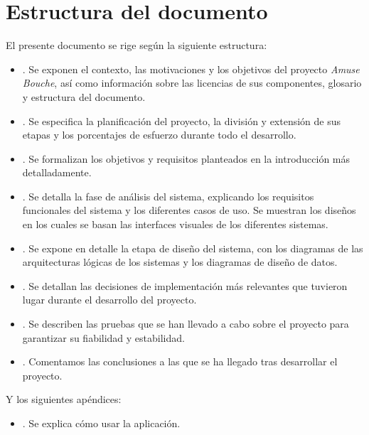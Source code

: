 \section{Estructura del documento}
El presente documento se rige según la siguiente estructura:

\begin{itemize}
\item \textbf{}. Se exponen el contexto, las
  motivaciones y los objetivos del proyecto \textit{Amuse Bouche}, así como
  información sobre las licencias de sus componentes, glosario y estructura del
  documento.

\item \textbf{}. Se especifica la planificación del
  proyecto, la división y extensión de sus etapas y los porcentajes de esfuerzo
  durante todo el desarrollo.

\item \textbf{}. Se formalizan los objetivos y
  requisitos planteados en la introducción más detalladamente.

\item \textbf{}. Se detalla la fase de análisis del
  sistema, explicando los requisitos funcionales del sistema y los diferentes
  casos de uso. Se muestran los diseños en los cuales se basan las interfaces
  visuales de los diferentes sistemas.

\item \textbf{}. Se expone en detalle la etapa de diseño
  del sistema, con los diagramas de las arquitecturas lógicas de los sistemas y
  los diagramas de diseño de datos.

\item \textbf{}. Se detallan las decisiones de
  implementación más relevantes que tuvieron lugar durante el desarrollo del
  proyecto.

\item \textbf{}. Se describen las pruebas que se han
  llevado a cabo sobre el proyecto para garantizar su fiabilidad y estabilidad.

\item \textbf{}. Comentamos las conclusiones a las
  que se ha llegado tras desarrollar el proyecto.
\end{itemize}

Y los siguientes apéndices:
\begin{itemize}
\item \textbf{}. Se explica cómo usar la aplicación.
\end{itemize}
